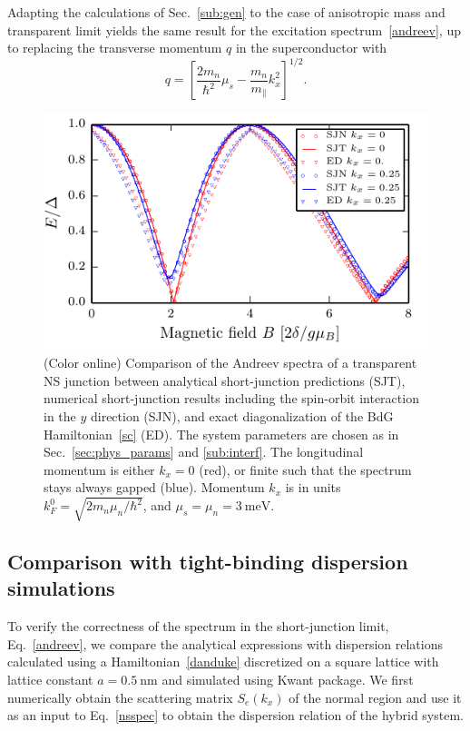 Adapting the calculations of Sec.~\ref{sub:gen} to the case of anisotropic mass and transparent limit yields the same result for the excitation spectrum~\eqref{andreev}, up to replacing the transverse momentum $q$ in the superconductor with
\begin{equation}\label{aniso}
q = \left[\frac{2m_n}{\hbar^2}\mu_s
-\frac{m_n}{m_\parallel}k_x^2\right]^{1/2}.
\end{equation}

\begin{figure}[t]
\includegraphics[width=\columnwidth]{chapter_shortjunction/figures/spec_comp}
\caption{(Color online) Comparison of the Andreev spectra of a transparent NS junction between analytical short-junction predictions (SJT), numerical short-junction results including the spin-orbit interaction in the $y$ direction (SJN), and exact diagonalization of the BdG Hamiltonian~\eqref{sc} (ED).
The system parameters are chosen as in Sec.~\ref{sec:phys_params} and \ref{sub:interf}.
The longitudinal momentum is either $k_x=0$ (red), or finite such that the spectrum stays always gapped (blue).
Momentum $k_x$ is in units $k_F^0=\sqrt{2m_n\mu_n/\hbar^2}$, and $\mu_s=\mu_n=\SI{3}{\meV}$.}
\label{fig:spec_comp}
\end{figure}

\subsection{Comparison with tight-binding dispersion simulations}
To verify the correctness of the spectrum in the short-junction limit, Eq.~\eqref{andreev}, we compare the analytical expressions with dispersion relations calculated using a Hamiltonian~\eqref{danduke} discretized on a square lattice with lattice constant $a=\SI{0.5}{\nm}$ and simulated using Kwant package\cite{Groth2014}.
We first numerically obtain the scattering matrix $S_e(k_x)$ of the normal region and use it as an input to Eq.~\eqref{nsspec} to obtain the dispersion relation of the hybrid system.

